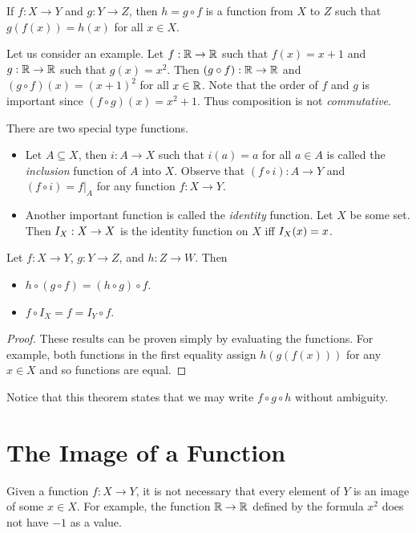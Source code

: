 \begin{definition}
    If $f : X \to Y$ and $g : Y \to Z$, then $h = g \circ f$ is a
    function from $X$ to $Z$ such that $g(f(x)) = h(x)$ for all $x \in X$.
\end{definition}

Let us consider an example. Let $f : {\mathbb{R}} \to {\mathbb{R}}$ such that $f(x) = x + 1$ and
$g : {\mathbb{R}} \to {\mathbb{R}}$ such that $g(x) = x^2$. Then $(g \circ f) : {\mathbb{R}} \to {\mathbb{R}}$ and
$(g \circ f)(x) = (x + 1)^2$ for all $x \in {\mathbb{R}}$. Note that the order of $f$ and
$g$ is important since $(f \circ g)(x) = x^2 + 1$. Thus composition is not
\emph{commutative}.

There are two special type functions.
\begin{itemize}
    \item Let $A \subseteq X$, then $i : A \to X$ such that $i(a) = a$ for all
        $a \in A$ is called the \emph{inclusion} function of $A$ into $X$. Observe
        that $(f \circ i) : A \to Y$ and $(f \circ i) = f|_A$
        for any function $f : X \to Y$.
    \item Another important function is called the \emph{identity} function.
        Let $X$ be some set. Then $I_{X} : X \to X$ is the identity
        function on $X$ iff $I_{X}(x) = x$.
\end{itemize}

\begin{theorem}
    Let $f : X \to Y$, $g : Y \to Z$, and $h : Z \to W$. Then
    \begin{itemize}
        \item $h \circ (g \circ f) = (h \circ g) \circ f$.
        \item $f \circ I_X = f = I_Y \circ f$.
    \end{itemize}
\end{theorem}
\begin{proof}
    These results can be proven simply by evaluating the functions. For example,
    both functions in the first equality assign $h(g(f(x)))$ for any $x \in X$
    and so functions are equal.
\end{proof}
Notice that this theorem states that we may write $f \circ g \circ h$ without
ambiguity.

\section{The Image of a Function}
Given a function $f : X \to Y$, it is not necessary that every element of $Y$
is an image of some $x \in X$. For example, the function ${\mathbb{R}} \to {\mathbb{R}}$ defined by
the formula $x^2$ does not have $-1$ as a value.

